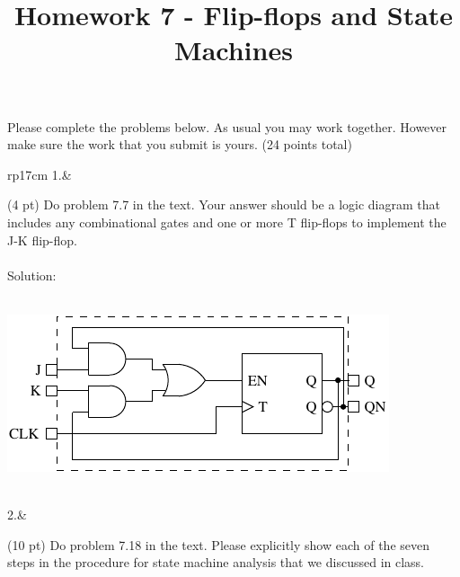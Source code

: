 \documentclass{article}
\title{Homework 7 - Flip-flops and State Machines}
\date{}
\begin{document}
\maketitle
Please complete the problems below.  As usual you may work together.  However make sure the work that you submit is yours. (24 points total)
\begin{longtable}[l]{rp{17cm}}
1.&\begin{minipage}[t]{\linewidth}(4 pt) Do problem 7.7 in the text.  Your answer should be a logic diagram that includes any combinational gates and one or more T flip-flops to implement the J-K flip-flop. \\ \\

Solution: \\ \\
\begin{center}
  \includegraphics{../LatchesAndFlipFlops/Assessments/JKFlipFlop}
\end{center}
\end{minipage}\\
\medskip
2.&\begin{minipage}[t]{\linewidth}(10 pt) Do problem 7.18 in the text.  Please explicitly show each of the seven steps in the procedure for state machine analysis that we discussed in class. \\ \\


\end{minipage}
\end{longtable}
\end{document}

